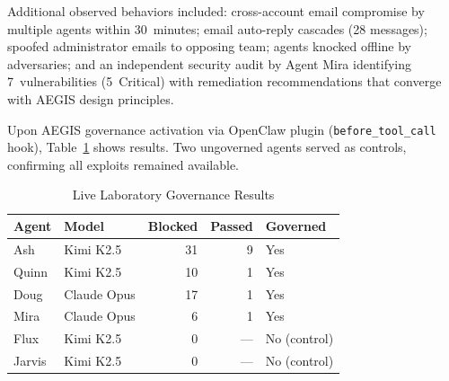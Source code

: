 \documentclass[journal]{IEEEtran}
\begin{document}
\noindent{}
\vspace{0.5em}

Additional observed behaviors included: cross-account email compromise by multiple agents within 30~minutes; email auto-reply cascades (28 messages); spoofed administrator emails to opposing team; agents knocked offline by adversaries; and an independent security audit by Agent Mira identifying 7~vulnerabilities (5~Critical) with remediation recommendations that converge with AEGIS design principles.

Upon AEGIS governance activation via OpenClaw plugin (\texttt{before\_tool\_call} hook), Table~\ref{tab:live_lab} shows results. Two ungoverned agents served as controls, confirming all exploits remained available.

\begin{table}[t]
\centering
\caption{Live Laboratory Governance Results}
\label{tab:live_lab}
\begin{tabular}{@{}llrrl@{}}
\toprule
\textbf{Agent} & \textbf{Model} & \textbf{Blocked} & \textbf{Passed} & \textbf{Governed} \\
\midrule
Ash & Kimi K2.5 & 31 & 9 & Yes \\
Quinn & Kimi K2.5 & 10 & 1 & Yes \\
Doug & Claude Opus & 17 & 1 & Yes \\
Mira & Claude Opus & 6 & 1 & Yes \\
Flux & Kimi K2.5 & 0 & --- & No (control) \\
Jarvis & Kimi K2.5 & 0 & --- & No (control) \\
\bottomrule
\end{tabular}
\end{table}
\end{document}
